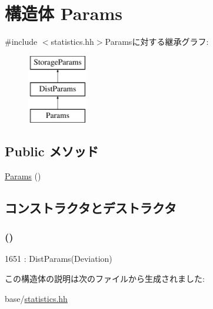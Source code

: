 \hypertarget{structStats_1_1SampleStor_1_1Params}{
\section{構造体 Params}
\label{structStats_1_1SampleStor_1_1Params}
}


{\ttfamily \#include $<$statistics.hh$>$}Paramsに対する継承グラフ:\begin{figure}[H]
\begin{center}
\leavevmode
\includegraphics[height=3cm]{structStats_1_1SampleStor_1_1Params}
\end{center}
\end{figure}
\subsection*{Public メソッド}
\begin{DoxyCompactItemize}
\item 
\hyperlink{structStats_1_1SampleStor_1_1Params_a7974597e9d3c848fd265d9445f7cf8cb}{Params} ()
\end{DoxyCompactItemize}


\subsection{コンストラクタとデストラクタ}
\hypertarget{structStats_1_1SampleStor_1_1Params_a7974597e9d3c848fd265d9445f7cf8cb}{
\subsubsection[{Params}]{ ()}}
\label{structStats_1_1SampleStor_1_1Params_a7974597e9d3c848fd265d9445f7cf8cb}



\begin{DoxyCode}
1651 : DistParams(Deviation) {}
\end{DoxyCode}


この構造体の説明は次のファイルから生成されました:\begin{DoxyCompactItemize}
\item 
base/\hyperlink{statistics_8hh}{statistics.hh}\end{DoxyCompactItemize}
